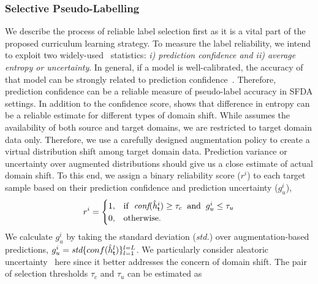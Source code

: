 \documentclass[10pt,twocolumn,letterpaper]{article}
\begin{document}
\subsubsection{Selective Pseudo-Labelling}
\label{sec:selection}
\vspace{-1mm}
We describe the process of reliable label selection first as it is a vital part of the proposed curriculum learning strategy. To measure the label reliability, we intend to exploit two widely-used~\cite{dong2021confident,qiao2021uncertainty,wang2021uncertainty,hubalanced} statistics: \emph{i) prediction confidence and ii) average entropy or uncertainty}. In general, if a model is well-calibrated, the accuracy of that model can be strongly related to prediction confidence~\cite{guillory2021predicting}. Therefore, prediction confidence can be a reliable measure of pseudo-label accuracy in SFDA settings. In addition to the confidence score, \cite{guillory2021predicting} shows that difference in entropy can be a reliable estimate for different types of domain shift. While \cite{guillory2021predicting} assumes the availability of both source and target domains, we are restricted to target domain data only. Therefore, we use a carefully designed augmentation policy to create a virtual distribution shift among target domain data. Prediction variance or uncertainty over augmented distributions should give us a close estimate of actual domain shift. To this end, we assign a binary reliability score (${r}^i$) to each target sample based on their prediction confidence and prediction uncertainty ($g_u^i$),
\begin{equation}
    \vspace{-2mm}
    {r}^i = \begin{cases}
      1, & \text{if} \hspace{1mm} \textit{  conf}(\Hat{h}_\mathsf{t}^i) \geq \tau_c \hspace{2mm} \text{and} \hspace{2mm} g_u^i \leq \tau_u\\ 0, & \text{otherwise}.\label{eq:reliability}
    \end{cases} 
    \vspace{-1mm}
\end{equation}
We calculate $g_u^i$ by taking the standard deviation (\textit{std.}) over augmentation-based predictions, $g_u^i = \textit{std}\{conf(\Hat{h}_\mathsf{t}^l)\}_{l=1}^{l=L}$. We particularly consider aleatoric uncertainty~\cite{hullermeier2021aleatoric} here since it better addresses the concern of domain shift. The pair of selection thresholds $\tau_c$ and $\tau_u$ can be estimated as 
\end{document}
